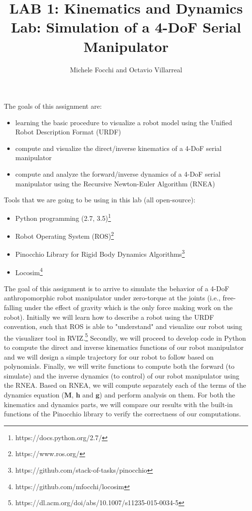 \documentclass[11pt]{article}
\title{LAB 1: Kinematics and Dynamics Lab: Simulation of a 4-DoF Serial Manipulator}
\author{Michele Focchi and Octavio Villarreal}
\date{}
\begin{document}
\maketitle
\noindent
The goals of this assignment are:
\begin{itemize}
    \item learning the basic procedure to visualize a robot model using the Unified Robot Description Format (URDF)
    \item compute and visualize the direct/inverse kinematics of a 4-DoF serial manipulator 
    \item compute and analyze the forward/inverse dynamics of a 4-DoF serial manipulator using the Recursive Newton-Euler Algorithm (RNEA)
\end{itemize}

\noindent
Tools that we are going to be using in this lab (all open-source):
\begin{itemize}
	\item Python programming (2.7, 3.5)\footnote{https://docs.python.org/2.7/}
	\item Robot Operating System (ROS)\footnote{https://www.ros.org/}
	\item Pinocchio Library for Rigid Body Dynamics Algorithms\footnote{https://github.com/stack-of-tasks/pinocchio}
	\item Locosim\footnote{https://github.com/mfocchi/locosim}
\end{itemize}
%
%
The goal of this assignment is to arrive to simulate the behavior of a 4-DoF anthropomorphic robot manipulator under zero-torque at the joints (i.e., free-falling under the effect of gravity which is the only force making work on the robot). Initially we will learn how to describe a robot using the URDF convention, such that ROS is able to "understand" and visualize our robot using the visualizer tool in RVIZ.\footnote{https://dl.acm.org/doi/abs/10.1007/s11235-015-0034-5} Secondly, we will proceed to develop code in Python to compute the direct and inverse kinematics functions of  our robot manipulator and we will design a simple trajectory for our robot to follow based on polynomials. Finally, we will write functions to compute both the forward (to simulate) and the inverse dynamics (to control) of our robot manipulator using the RNEA.  Based on RNEA, we will compute separately each of the terms of the dynamics equation ($\mathbf{M}$, $\mathbf{h}$ and $\mathbf{g}$) and perform analysis on them. For both the kinematics and dynamics parts, we will compare our results with the built-in functions of the Pinocchio library to verify the correctness of our computations.
\end{document}
